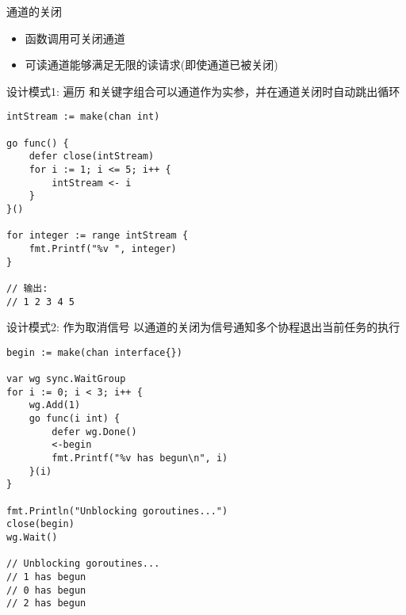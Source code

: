\begin{frame}{通道的关闭}
    \begin{itemize}
        \item {}函数调用可关闭通道
        \item 可读通道能够满足无限的读请求(即使通道已被关闭)
    \end{itemize}
\end{frame}

\begin{frame}[fragile]{设计模式1: 遍历}
    和关键字组合可以通道作为实参，并在通道关闭时自动跳出循环
\begin{lstlisting}
intStream := make(chan int)

go func() {
    defer close(intStream)
    for i := 1; i <= 5; i++ {
        intStream <- i
    }
}()

for integer := range intStream {
    fmt.Printf("%v ", integer)
}

// 输出:
// 1 2 3 4 5 
\end{lstlisting}    
\end{frame}

\begin{frame}[fragile]{设计模式2: 作为取消信号}
    以通道的关闭为信号通知多个协程退出当前任务的执行
\begin{lstlisting}
begin := make(chan interface{})

var wg sync.WaitGroup
for i := 0; i < 3; i++ {
    wg.Add(1)
    go func(i int) {
        defer wg.Done()
        <-begin
        fmt.Printf("%v has begun\n", i)
    }(i)
}

fmt.Println("Unblocking goroutines...")
close(begin)
wg.Wait()

// Unblocking goroutines...
// 1 has begun
// 0 has begun
// 2 has begun
\end{lstlisting}
\end{frame}

